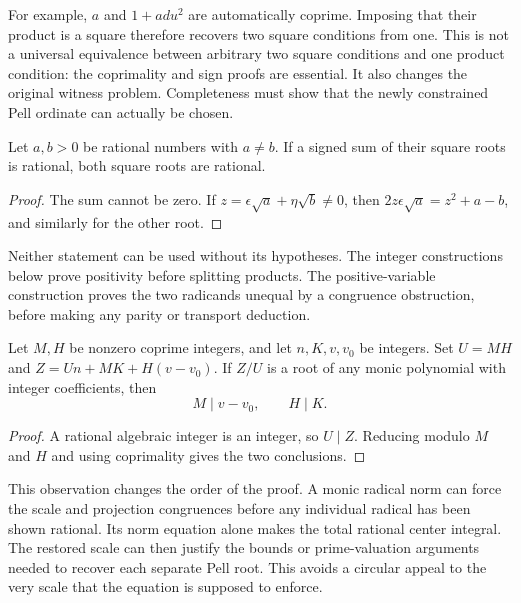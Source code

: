 For example, $a$ and $1+ad u^2$ are automatically coprime. Imposing that
their product is a square therefore recovers two square conditions from
one. This is not a universal equivalence between arbitrary two square
conditions and one product condition: the coprimality and sign proofs are
essential. It also changes the original witness problem. Completeness must
show that the newly constrained Pell ordinate can actually be chosen.

\begin{lemma}
Let $a,b>0$ be rational numbers with $a\ne b$. If a signed sum of their
square roots is rational, both square roots are rational.
\end{lemma}
\begin{proof}
The sum cannot be zero. If $z=\epsilon\sqrt a+\eta\sqrt b\ne0$, then
$2z\epsilon\sqrt a=z^2+a-b$, and similarly for the other root.
\end{proof}

Neither statement can be used without its hypotheses. The integer
constructions below prove positivity before splitting products. The
positive-variable construction proves the two radicands unequal by a
congruence obstruction, before making any parity or transport deduction.

\begin{lemma}
Let $M,H$ be nonzero coprime integers, and let $n,K,v,v_0$ be integers.
Set $U=MH$ and $Z=Un+MK+H(v-v_0)$. If $Z/U$ is a root of any monic
polynomial with integer coefficients, then
\[
 M\mid v-v_0,\qquad H\mid K.
\]
\end{lemma}
\begin{proof}
A rational algebraic integer is an integer, so $U\mid Z$. Reducing modulo
$M$ and $H$ and using coprimality gives the two conclusions.
\end{proof}

This observation changes the order of the proof. A monic radical norm
can force the scale and projection congruences before any individual
radical has been shown rational. Its norm equation alone makes the total
rational center integral. The restored scale can then justify the bounds
or prime-valuation arguments needed to recover each separate Pell root.
This avoids a circular appeal to the very scale that the equation is
supposed to enforce.
